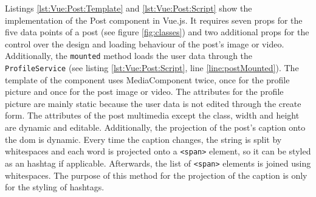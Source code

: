 \documentclass[a4paper, 12pt]{article}
\begin{document}
Listings \ref{lst:Vue:Post:Template} and \ref{lst:Vue:Post:Script} show the implementation of the Post component in Vue.js.
It requires seven props for the five data points of a post (see figure \ref{fig:classes}) and two additional props for the control over the design and loading behaviour of the post's image or video.
Additionally, the \verb|mounted| method loads the user data through the \verb|ProfileService| (see listing \ref{lst:Vue:Post:Script}, line \ref{line:postMounted}).
The template of the component uses MediaComponent twice, once for the profile picture and once for the post image or video.
The attributes for the profile picture are mainly static because the user data is not edited through the create form.
The attributes of the post multimedia except the class, width and height are dynamic and editable.
Additionally, the projection of the post's caption onto the \acrshort{dom} is dynamic.
Every time the caption changes, the string is split by whitespaces and each word is projected onto a \verb|<span>| element, so it can be styled as an hashtag if applicable.
Afterwards, the list of \verb|<span>| elements is joined using whitespaces.
The purpose of this method for the projection of the caption is only for the styling of hashtags.
\end{document}
